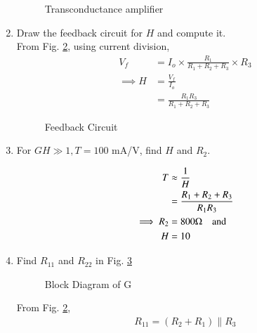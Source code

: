 \begin{enumerate}[label=\arabic*.,ref=\theenumi]
\begin{figure}[!ht]
	\begin{center}
		\resizebox{\columnwidth}{!}{}
	\end{center}
\caption{Transconductance amplifier}
\label{fig:ee18btech11041_fig4}
\end{figure}
%
\item  Draw the feedback circuit for $H$ and compute it.
\\
\solution From Fig. \ref{fig:ee18btech11041_fig5}, using current division,
%
\begin{align}
V_f &= I_o \times \frac{R_1}{R_1+R_2+R_3}\times R_3
\\
\implies 
H &= \frac{V_f}{I_o}
\\
&= \frac{R_1 R_3}{R_1+R_2+R_3}
\end{align}
\begin{figure}[!ht]
	\begin{center}
		\resizebox{\columnwidth}{!}{}
	\end{center}
\caption{Feedback Circuit}
\label{fig:ee18btech11041_fig5}
\end{figure}

\item For $GH \gg 1,T = 100$ mA/V, find $H$ and $R_2$.
\\
\solution 

\begin{align}
    T &\approx \frac{1}{H}
    \label{eq:ee18btech11041_eq6}
\\
     &= \frac{R_1+R_2+R_3}{R_1 R_3}
\\
\implies     R_2 &= 800 \ohm \quad \text{and}
    \label{eq:ee18btech11041_eq7}
\\
 H &=10
\end{align}

\item Find $R_{11}$ and $R_{22}$ in Fig. \ref{fig:ee18btech11041_fig6}
\\

\begin{figure}[!ht]
	\begin{center}
		\resizebox{\columnwidth}{!}{}
	\end{center}
\caption{Block Diagram of G}
\label{fig:ee18btech11041_fig6}
\end{figure}
\solution  From Fig. \ref{fig:ee18btech11041_fig5},
%
\begin{align}
    R_{11} = (R_2+R_1)\parallel R_3
\end{align}


\end{enumerate}
